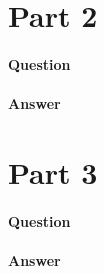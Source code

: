 \documentclass[11pt,twoside]{article}
\begin{document}
\clearpage



\section*{Part 2}

\paragraph{Question}

\paragraph{Answer}

\clearpage



\section*{Part 3}

\paragraph{Question}

\paragraph{Answer}

\clearpage
\end{document}
